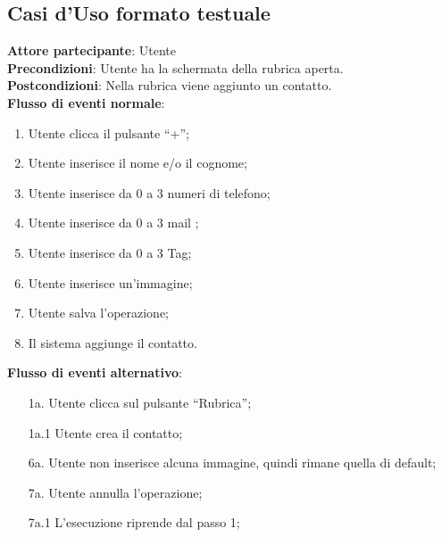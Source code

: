 \subsection{Casi d'Uso formato testuale}
\begin{tcolorbox}[colback=white,colframe=black!80!white,title=\textbf{C0 - Aggiungere contatto}]
\textbf{Attore partecipante}: Utente
\\\textbf{Precondizioni}: Utente ha la schermata della rubrica aperta.
\\\textbf{Postcondizioni}: Nella rubrica viene aggiunto un contatto.
\\\textbf{Flusso di eventi normale}:
\begin{enumerate}[noitemsep, topsep=0pt]
\item Utente clicca il pulsante “+”;
\item Utente inserisce il nome e/o il cognome;
\item Utente inserisce da 0 a 3 numeri di telefono;
\item 	Utente inserisce da 0 a 3 mail ;
\item 	Utente inserisce da 0 a 3 Tag;
\item 	Utente inserisce un’immagine;
\item 	Utente salva l’operazione;
\item 	Il sistema aggiunge il contatto.
\end{enumerate}
\textbf{Flusso di eventi alternativo}:
\begin{itemize}[noitemsep, topsep=0pt]
	\item[1a. ] Utente clicca sul pulsante “Rubrica”;
	\item[1a.1] Utente crea il contatto;
	\item[6a. ] Utente non inserisce alcuna immagine, quindi rimane quella di default;
	\item[7a. ] Utente annulla l’operazione;
	\item[7a.1] L’esecuzione riprende dal passo 1;
\end{itemize}
\end{tcolorbox}

